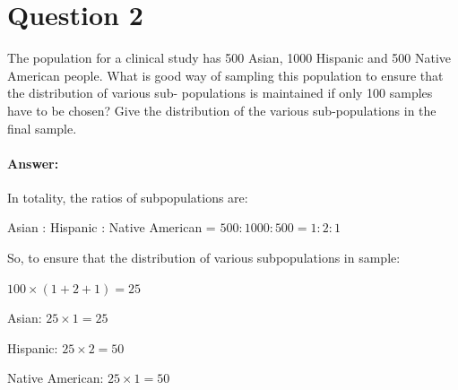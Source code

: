 \documentclass{article}
\begin{document}
\section*{Question 2}{
    The population for a clinical study has 500 Asian, 1000 Hispanic and 500 Native American people. What is good way of sampling this population to ensure that the distribution of various sub- populations is maintained if only 100 samples have to be chosen? Give the distribution of the various sub-populations in the final sample.

    \paragraph{Answer: }{
        In totality, the ratios of subpopulations are:

        \begin{center}{
            Asian : Hispanic : Native American = \(500:1000:500 = 1:2:1\)
        }
        \end{center}
        So, to ensure that the distribution of various subpopulations in sample:

        \(100\times(1+2+1)=25\)

        Asian: \(25\times1=25\)

        Hispanic: \(25\times2=50\)

        Native American: \(25\times1 = 50\)
    }
}
\end{document}
